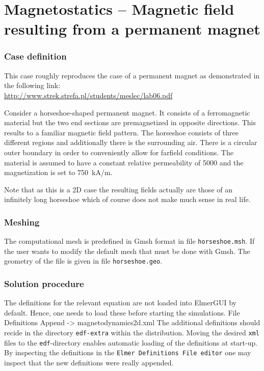 \chapter{Magnetostatics -- Magnetic field resulting from a permanent magnet}




\subsection*{Case definition}

This case roughly reproduces the case of a permanent magnet as demonstrated in 
the following link: \\
\url{http://www.strek.strefa.pl/students/meslec/lab06.pdf}

Consider a horseshoe-shaped permanent magnet. It consists of a ferromagnetic material but the two end 
sections are premagnetized in opposite directions. This results to a familiar magnetic field pattern.
The horseshoe consists of three different regions and additionally there is the surrounding air.
There is a circular outer boundary in order to conveniently allow for farfield conditions.  
The material is assumed to have a constant relative permeability of 5000 and the magnetization is 
set to 750~kA/m. 

Note that as this is a 2D case the resulting fields actually are those of an infinitely long 
horseshoe which of course does not make much sense in real life. 


\subsection*{Meshing}

The computational mesh is predefined in Gmsh format in file \texttt{horseshoe.msh}. 
If the user wants to modify the default mesh that must be done with Gmsh. The geometry of 
the file is given in file \texttt{horseshoe.geo}.


\subsection*{Solution procedure}

The definitions for the relevant equation are not loaded into ElmerGUI by default. Hence, 
one needs to load these before starting the simulations.
\ttbegin
File 
  Definitions
    Append -> magnetodynamics2d.xml
\ttend
The additional definitions should recide in the directory \texttt{edf-extra} within the distribution.
Moving the desired \texttt{xml} files to the \texttt{edf}-directory enables automatic loading of the 
definitions at start-up. By inspecting the definitions in the \texttt{Elmer Definitions File editor} one
may inspect that the new definitions were really appended. 

